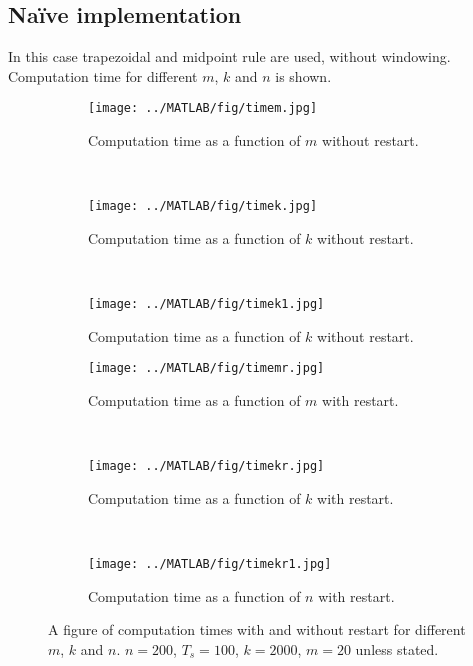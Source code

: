 \subsection{Naïve implementation} \label{sec:naive}
In this case trapezoidal and midpoint rule are used, without windowing. Computation time for different $m$, $k$ and $n$ is shown.
\begin{figure}[H]
        \centering
        \begin{subfigure}[b]{0.3\textwidth}
                \texttt{[image: ../MATLAB/fig/timem.jpg]}
                \caption{ Computation time as a function of $m$ without restart. }
                \label{fig:timem}
        \end{subfigure}
        ~
        \begin{subfigure}[b]{0.3\textwidth}
                \texttt{[image: ../MATLAB/fig/timek.jpg]}
                \caption{ Computation time as a function of $k$ without restart. }
                \label{fig:timek}
        \end{subfigure}
        ~
        \begin{subfigure}[b]{0.3\textwidth}
                \texttt{[image: ../MATLAB/fig/timek1.jpg]}
                \caption{ Computation time as a function of $k$ without restart. }
                \label{fig:timek1}
        \end{subfigure}
        
        \begin{subfigure}[b]{0.3\textwidth}
                \texttt{[image: ../MATLAB/fig/timemr.jpg]}
                \caption{ Computation time as a function of $m$ with restart. }
                \label{fig:timemr}
        \end{subfigure}
        ~
        \begin{subfigure}[b]{0.3\textwidth}
                \texttt{[image: ../MATLAB/fig/timekr.jpg]}
                \caption{ Computation time as a function of $k$ with restart. }
                \label{fig:timekr}
        \end{subfigure}
        ~
        \begin{subfigure}[b]{0.3\textwidth}
                \texttt{[image: ../MATLAB/fig/timekr1.jpg]}
                \caption{ Computation time as a function of $n$ with restart. }
                \label{fig:timekr1}
        \end{subfigure}          
        
        \caption{ A figure of computation times with and without restart for different $m$, $k$ and $n$. $n = 200$, $T_s = 100$, $k = 2000$, $m = 20$ unless stated. }
        \label{fig:time0}
\end{figure}
